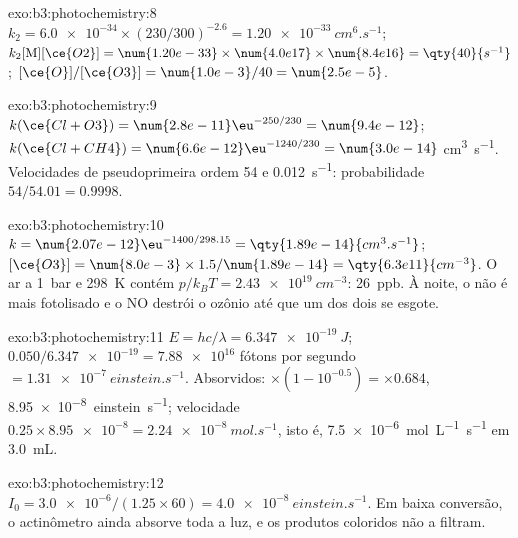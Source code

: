 \begin{solution}{exo:b3:photochemistry:8}
$k_2 = \num{6.0e-34} \times (230/300)^{-2.6} = \qty{1.20e-33}{cm^6.s^{-1}}$; $k_2[\mathrm M][\ce{O2}] = \num{1.20e-33} \times
\num{4.0e17} \times \num{8.4e16} = \qty{40}{s^{-1}}$; $[\ce{O}]/[\ce{O3}] = \num{1.0e-3}/40 = \num{2.5e-5}$.
\end{solution}

\begin{solution}{exo:b3:photochemistry:9}
$k(\ce{Cl + O3}) = \num{2.8e-11}\eu^{-250/230} = \num{9.4e-12}$; $k(\ce{Cl + CH4}) = \num{6.6e-12}\eu^{-1240/230} = \num{3.0e-14}$
\unit{cm^3.s^{-1}}. Velocidades de pseudoprimeira ordem 54 e \qty{0.012}{s^{-1}}: probabilidade $54/54.01 = 0.9998$.
\end{solution}

\begin{solution}{exo:b3:photochemistry:10}
$k = \num{2.07e-12}\eu^{-1400/298.15} = \qty{1.89e-14}{cm^3.s^{-1}}$; $[\ce{O3}] = \num{8.0e-3} \times 1.5/\num{1.89e-14} =
\qty{6.3e11}{cm^{-3}}$. O ar a \qty{1}{bar} e \qty{298}{K} contém $p/k_BT = \qty{2.43e19}{cm^{-3}}$: \qty{26}{ppb}. À noite,
o  não é mais fotolisado e o NO destrói o ozônio até que um dos dois se esgote.
\end{solution}

\begin{solution}{exo:b3:photochemistry:11}
$E = hc/\lambda = \qty{6.347e-19}{J}$; $0.050/\num{6.347e-19} = \num{7.88e16}$ fótons por segundo $= \qty{1.31e-7}{einstein.s^{-1}}$.
Absorvidos: $\times(1 - 10^{-0.5}) = \times0.684$, \qty{8.95e-8}{einstein.s^{-1}}; velocidade $0.25 \times \num{8.95e-8} =
\qty{2.24e-8}{mol.s^{-1}}$, isto é, \qty{7.5e-6}{mol.L^{-1}.s^{-1}} em \qty{3.0}{mL}.
\end{solution}

\begin{solution}{exo:b3:photochemistry:12}
$I_0 = \num{3.0e-6}/(1.25 \times 60) = \qty{4.0e-8}{einstein.s^{-1}}$. Em baixa conversão, o actinômetro
ainda absorve toda a luz, e os produtos coloridos não a filtram.
\end{solution}

